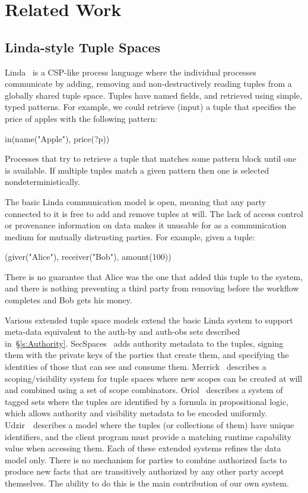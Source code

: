 
\clearpage{}

\label{s:Related}
\section{Related Work}

\subsection{Linda-style Tuple Spaces}
Linda~\cite{Gelernter1985:Linda} is a CSP-like process language where the individual processes communicate by adding, removing and non-destructively reading tuples from a globally shared tuple space. Tuples have named fields, and retrieved using simple, typed patterns. For example, we could retrieve (input) a tuple that specifies the price of apples with the following pattern:
\begin{code}
   in(name("Apple"), price(?p))
\end{code}
Processes that try to retrieve a tuple that matches some pattern block until one is available. If multiple tuples match a given pattern then one is selected nondeterministically.

The basic Linda communication model is open, meaning that any party connected to it is free to add and remove tuples at will. The lack of access control or provenance information on data makes it unusable for as a communication medium for mutually distrusting parties. For example, given a tuple:
\begin{code}
   (giver("Alice"), receiver("Bob"), amount(100))
\end{code}
There is no guarantee that Alice was the one that added this tuple to the system, and there is nothing preventing a third party from removing before the workflow completes and Bob gets his money.

Various extended tuple space models extend the basic Linda system to support meta-data equivalent to the auth-by and auth-obs sets described in~\S\ref{s:Authority}. SecSpaces~\cite{Busi2003:SecSpaces} adds authority metadata to the tuples, signing them with the private keys of the parties that create them, and specifying the identities of those that can see and consume them. Merrick~\cite{Merrick2000:Scopes} describes a scoping/visibility system for tuple spaces where new scopes can be created at will and combined using a set of scope combinators. Oriol~\cite{Oriol2005:TaggedSets} describes a system of tagged sets where the tuples are identified by a formula in propositional logic, which allows authority and visibility metadata to be encoded uniformly. Udzir~\cite{Udzir2007:MultiCapabilities}~describes a model where the tuples (or collections of them) have unique identifiers, and the client program must provide a matching runtime capability value when accessing them. Each of these extended systems refines the data model only. There is no mechanism for parties to combine authorized facts to produce new facts that are transitively authorized by any other party accept themselves. The ability to do this is the main contribution of our own system.


